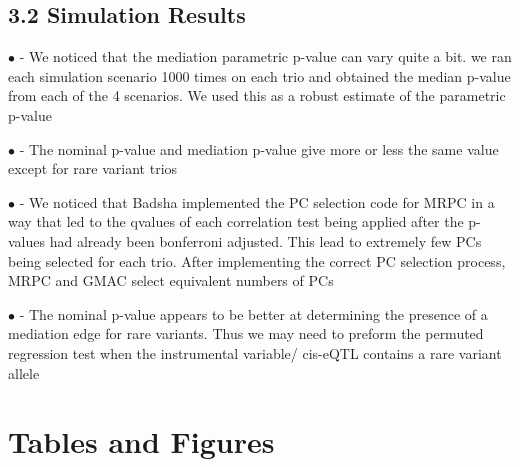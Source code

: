 \documentclass[
]{article}
\begin{document}
\subsection*{3.2 Simulation Results}

\(\bullet\) - We noticed that the mediation parametric p-value can vary
quite a bit. we ran each simulation scenario 1000 times on each trio and
obtained the median p-value from each of the 4 scenarios. We used this
as a robust estimate of the parametric p-value

\(\bullet\) - The nominal p-value and mediation p-value give more or
less the same value except for rare variant trios

\(\bullet\) - We noticed that Badsha implemented the PC selection code
for MRPC in a way that led to the qvalues of each correlation test being
applied after the p-values had already been bonferroni adjusted. This
lead to extremely few PCs being selected for each trio. After
implementing the correct PC selection process, MRPC and GMAC select
equivalent numbers of PCs

\(\bullet\) - The nominal p-value appears to be better at determining
the presence of a mediation edge for rare variants. Thus we may need to
preform the permuted regression test when the instrumental variable/
cis-eQTL contains a rare variant allele

\newpage
\section{Tables and Figures}
\end{document}
